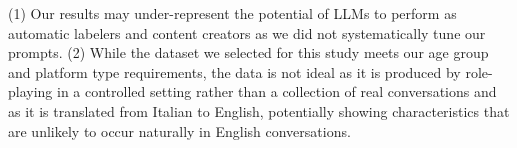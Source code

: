 (1) Our results may under-represent the potential of LLMs to perform as automatic labelers and content creators as we did not systematically tune our prompts.
%
(2) While the dataset we selected for this study meets our age group and platform type requirements, the data is not ideal as it is produced by role-playing in a controlled setting rather than a collection of real conversations and as it is translated from Italian to English, potentially showing characteristics that
are unlikely to occur naturally in English conversations.

